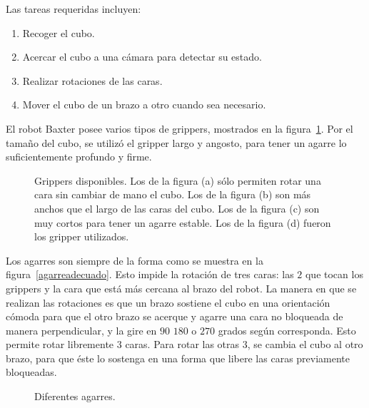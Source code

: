 Las tareas requeridas incluyen:
\begin{enumerate}
	\item Recoger el cubo.
	\item Acercar el cubo a una cámara para detectar su estado.
	\item Realizar rotaciones de las caras.
	\item Mover el cubo de un brazo a otro cuando sea necesario.
\end{enumerate}

El robot Baxter posee varios tipos de grippers, mostrados en la figura~\ref{grippers}. Por el tamaño del cubo, se utilizó el gripper largo y angosto, para tener un agarre lo suficientemente profundo y firme.

\begin{figure}[h!]
	\centering
	\hfill
	\hfill
	\hfill
	\caption[Pinzas disponibles.]{Grippers disponibles. Los de la figura (a) sólo permiten rotar una cara sin cambiar de mano el cubo. Los de la figura (b) son más anchos que el largo de las caras del cubo. Los de la figura (c) son muy cortos para tener un agarre estable. Los de la figura (d) fueron los gripper utilizados.}
	\label{grippers}
\end{figure}

Los agarres son siempre de la forma como se muestra en la figura~\ref{agarreadecuado}. Esto impide la rotación de tres caras: las $2$ que tocan los grippers y la cara que está más cercana al brazo del robot. La manera en que se realizan las rotaciones es que un brazo sostiene el cubo en una orientación cómoda para que el otro brazo se acerque y agarre una cara no bloqueada de manera perpendicular, y la gire en $90$ $180$ o $270$ grados según corresponda. Esto permite rotar libremente $3$ caras. Para rotar las otras $3$, se cambia el cubo al otro brazo, para que éste lo sostenga en una forma que libere las caras previamente bloqueadas.

\begin{figure}[h!]
	\centering
	\hfill
	\hfill
	\hfill
	\caption{Diferentes agarres.}
	\label{agarre}
\end{figure}

